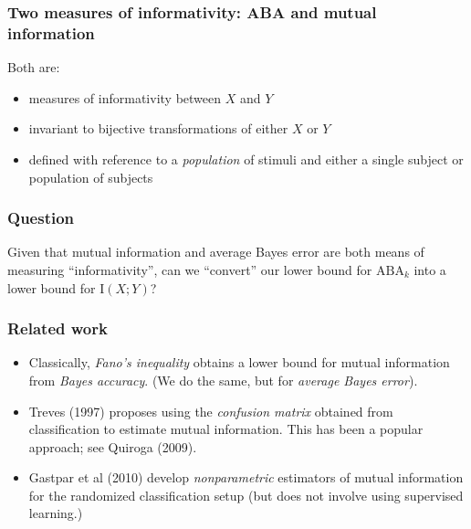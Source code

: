 \documentclass{beamer}
\begin{document}
\begin{frame}
\frametitle{Two measures of informativity: ABA and mutual information}
Both are:
\begin{itemize}
\item measures of informativity between $X$ and $Y$
\item invariant to bijective transformations of either $X$ or $Y$
\item defined with reference to a \emph{population} of stimuli and either a single subject or population of subjects
\end{itemize}
\end{frame}

\begin{frame}
\frametitle{Question} Given that mutual information and average Bayes
error are both means of measuring ``informativity'', can we
``convert'' our lower bound for $\text{ABA}_k$ into a lower bound for
$\text{I}(X; Y)$?
\end{frame}

\begin{frame}
\frametitle{Related work}
\begin{itemize}
\item Classically, \emph{Fano's inequality} obtains a lower bound for
  mutual information from \emph{Bayes accuracy}.  (We do the same, but
  for \emph{average Bayes error}).
\item Treves (1997) proposes using the \emph{confusion matrix}
  obtained from classification to estimate mutual information.  This
  has been a popular approach; see Quiroga (2009).
\item Gastpar et al (2010) develop \emph{nonparametric} estimators of
  mutual information for the randomized classification setup (but does
  not involve using supervised learning.)
\end{itemize}
\end{frame}


\end{document}
